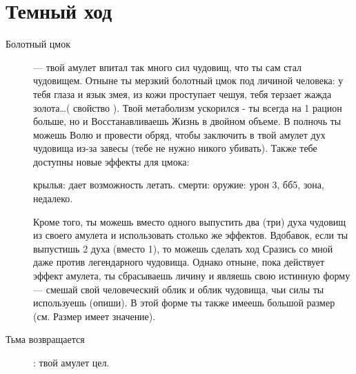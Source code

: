 \documentclass[10pt,twoside]{report}
\begin{document}
\section*{Темный ход}
\begin{description}
\item[Болотный цмок]--- твой амулет впитал так много сил чудовищ, что
  ты сам стал чудовищем. Отныне ты мерзкий болотный цмок под личиной
  человека: у тебя глаза и язык змея, из кожи проступает чешуя, тебя
  терзает жажда золота\ldots ( свойство {}). Твой
  метаболизм ускорился - ты всегда { на 1 рацион
    больше}, но и Восстанавливаешь Жизнь в двойном объеме. В полночь
  ты можешь { Волю} и провести обряд, чтобы
  заключить в твой амулет дух чудовища из-за завесы (тебе не нужно
  никого убивать). Также тебе доступны новые эффекты для
  { цмока}:
  \begin{itemize}[noitemsep]
   крылья: дает возможность летать.
   смерти: оружие: урон 3, бб5, зона, недалеко.
  \end{itemize}
 Кроме того, ты можешь  вместо одного выпустить два (три) духа чудовищ из своего амулета
    и использовать столько же эффектов. Вдобавок, если ты выпустишь 2
    духа (вместо 1), то можешь сделать ход Сразись со мной даже против легендарного чудовища. Однако отныне, пока действует эффект
    амулета, ты сбрасываешь личину и являешь свою истинную форму--- смешай свой человеческий облик и облик чудовища, чьи силы ты
    используешь (опиши). В этой форме ты также имеешь большой размер (см. Размер имеет значение).
 \item[Тьма возвращается]: твой амулет цел.
 \end{description}
 \vfill
\pagebreak
\end{document}
